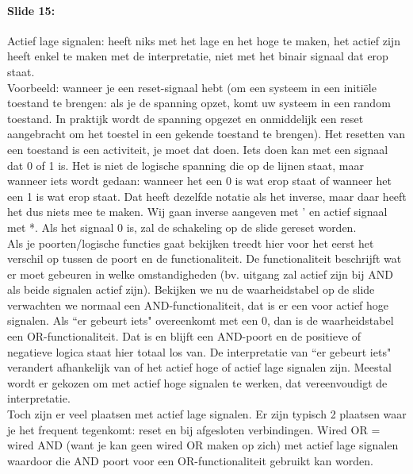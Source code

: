 \documentclass[10pt,a4paper]{book}
\begin{document}
\paragraph{Slide 15:} Actief lage signalen: heeft niks met het lage en het hoge te maken, het actief zijn heeft enkel te maken met de interpretatie, niet met het binair signaal dat erop staat. \\
Voorbeeld: wanneer je een reset-signaal hebt (om een systeem in een initi\"ele toestand te brengen: als je de spanning opzet, komt uw systeem in een random toestand. In praktijk wordt de spanning opgezet en onmiddelijk een reset aangebracht om het toestel in een gekende toestand te brengen). Het resetten van een toestand is een activiteit, je moet dat doen. Iets doen kan met een signaal dat 0 of 1 is. Het is niet de logische spanning die op de lijnen staat, maar wanneer iets wordt gedaan: wanneer het een 0 is wat erop staat of wanneer het een 1 is wat erop staat. Dat heeft dezelfde notatie als het inverse, maar daar heeft het dus niets mee te maken. Wij gaan inverse aangeven met ' en actief signaal met *. Als het signaal 0 is, zal de schakeling op de slide gereset worden.\\
Als je poorten/logische functies gaat bekijken treedt hier voor het eerst het verschil op tussen de poort en de functionaliteit. De functionaliteit beschrijft wat er moet gebeuren in welke omstandigheden (bv. uitgang zal actief zijn bij AND als  beide signalen actief zijn). Bekijken we nu de waarheidstabel op de slide verwachten we normaal een AND-functionaliteit, dat is er een voor actief hoge signalen. Als ``er gebeurt iets" overeenkomt met een 0, dan is de waarheidstabel een OR-functionaliteit. Dat is en blijft een AND-poort en de positieve of negatieve logica staat hier totaal los van. De interpretatie van ``er gebeurt iets" verandert afhankelijk van of het actief hoge of actief lage signalen zijn. Meestal wordt er gekozen om met actief hoge signalen te werken, dat vereenvoudigt de interpretatie. \\
Toch zijn er veel plaatsen met actief lage signalen. Er zijn typisch 2 plaatsen waar je het frequent tegenkomt: reset en bij afgesloten verbindingen. Wired OR = wired AND (want je kan geen wired OR maken op zich) met actief lage signalen waardoor die AND poort voor een OR-functionaliteit gebruikt kan worden. 
\end{document}
